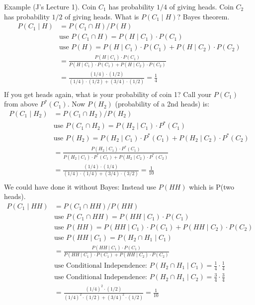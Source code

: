 Example {\tiny (J's Lecture 1)}.  Coin $C_1$ has probability $1/4$ of giving heads.  Coin $C_2$ has probability $1/2$ of giving heads.  What is $P(C_1 \mid H)$?  Bayes theorem.   
 	\begin{align*}
	P(C_1 \mid H) &= P(C_1 \cap H)/P(H) \\
		&\mbox{use } P(C_1 \cap H) = P(H \mid C_1) \cdot P(C_1) \\
		&\mbox{use } P(H) = P(H \mid C_1) \cdot P(C_1) + P(H \mid C_2) \cdot P(C_2) \\
			& = \frac{P(H \mid C_1) \cdot P(C_1)}{P(H \mid C_1) \cdot P(C_1) + P(H \mid C_2) \cdot P(C_2)} \\
			&= \frac{(1/4)\cdot (1/2)}{(1/4)\cdot (1/2) + (3/4)\cdot (1/2) } = \frac{1}{4}\\
	\end{align*}
If you get heads again, what is your probability of coin 1? Call your $P(C_1)$ from above $P^*(C_1)$.  Now $P(H_2)$ (probability of a 2nd heads) is:
	\begin{align*}
	P(C_1 \mid H_2) &= P(C_1 \cap H_2)/P(H_2) \\
		&\mbox{use } P(C_1 \cap H_2) = P(H_2 \mid C_1) \cdot P^*(C_1) \\
		&\mbox{use } P(H_2) = P(H_2 \mid C_1) \cdot P^*(C_1) + P(H_2 \mid C_2) \cdot P^*(C_2) \\
			& = \frac{P(H_2 \mid C_1) \cdot P^*(C_1)}{P(H_2 \mid C_1) \cdot P^*(C_1) + P(H_2 \mid C_2) \cdot P^*(C_2)} \\
			&= \frac{(1/4)\cdot (1/4)}{(1/4)\cdot (1/4) + (3/4)\cdot (3/2) } = \frac{1}{10}\\
	\end{align*}
We could have done it without Bayes: Instead use $P(HH)$ which is P(two heads).  
	\begin{align*}
	P(C_1 \mid HH) &= P(C_1 \cap HH)/P(HH) \\
		&\mbox{use } P(C_1 \cap HH) = P(HH \mid C_1) \cdot P(C_1) \\
		&\mbox{use } P(HH) = P(HH \mid C_1) \cdot P(C_1) + P(HH \mid C_2) \cdot P(C_2) \\
		&\mbox{use } P(HH \mid C_1) = P(H_2 \cap H_1 \mid C_1) \\
			& = \frac{P(HH \mid C_1) \cdot P(C_1)}{P(HH \mid C_1) \cdot P(C_1) + P(HH \mid C_2) \cdot P(C_2)} \\
		&\mbox{use Conditional Independence: } P(H_2 \cap H_1 \mid C_1) = \frac{1}{4} \cdot \frac{1}{4} \\
		&\mbox{use Conditional Independence: } P(H_2 \cap H_1 \mid C_2) = \frac{3}{4} \cdot \frac{3}{4} \\
			&= \frac{(1/4)^2\cdot (1/2)}{(1/4)^2\cdot (1/2) + (3/4)^2\cdot (1/2) } = \frac{1}{10}\\
	\end{align*}

